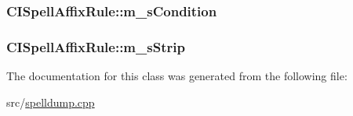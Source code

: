 \hypertarget{classCISpellAffixRule_a8a940c1a5a8c35a8982c8ad998424772}{
\subsubsection[{m\-\_\-s\-Condition}]{ C\-I\-Spell\-Affix\-Rule\-::m\-\_\-s\-Condition\hspace{0.3cm}{\ttfamily [private]}}}\label{classCISpellAffixRule_a8a940c1a5a8c35a8982c8ad998424772}
\hypertarget{classCISpellAffixRule_af16db690d0785a6906f4be50f14e1eea}{
\subsubsection[{m\-\_\-s\-Strip}]{ C\-I\-Spell\-Affix\-Rule\-::m\-\_\-s\-Strip\hspace{0.3cm}{\ttfamily [private]}}}\label{classCISpellAffixRule_af16db690d0785a6906f4be50f14e1eea}


The documentation for this class was generated from the following file\-:\begin{DoxyCompactItemize}
\item 
src/\hyperlink{spelldump_8cpp}{spelldump.\-cpp}\end{DoxyCompactItemize}
